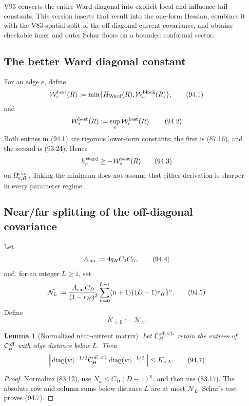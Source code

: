 \documentclass[11pt]{article}
\newtheorem{lemma}[theorem]{Lemma}
\theoremstyle{remark}
\begin{document}
V93 converts the entire Ward diagonal into explicit local and
influence-tail constants.  This version inserts that result into the
one-form Hessian, combines it with the V83 spatial split of the
off-diagonal current covariance, and obtains checkable inner and outer
Schur floors on a bounded conformal sector.

\subsection{The better Ward diagonal constant}

For an edge \(e\), define
\[
 \mathcal W_e^{\rm best}(R)
 :=\min\{H_{\rm Ward}(R),\mathcal W_e^{\rm block}(R)\},             \tag{94.1}
\]
and
\[
 \mathcal W_*^{\rm best}(R)
 :=\sup_e\mathcal W_e^{\rm best}(R).               \tag{94.2}
\]
Both entries in (94.1) are rigorous lower-form constants: the first is
(87.16), and the second is (93.24).  Hence
\[
 h_e^{\rm Ward}\geq-\mathcal W_e^{\rm best}(R)      \tag{94.3}
\]
on \(\Omega_{e,R}^{\rm star}\).  Taking the minimum does not assume
that either derivation is sharper in every parameter regime.

\subsection{Near/far splitting of the off-diagonal covariance}

Let
\[
 A_{\rm cur}:=4q_HC_0C_G,                           \tag{94.4}
\]
and, for an integer \(L\geq1\), set
\[
 \mathcal N_L
 :=\frac{A_{\rm cur}C_D}{(1-r_H)^2}
   \sum_{n=0}^{L-1}(n+1)\{(D-1)r_H\}^n.            \tag{94.5}
\]
Define
\[
 K_{<L}:=\mathcal N_L.                              \tag{94.6}
\]

\begin{lemma}[Normalized near-current matrix]
\label{lem:v17v94-near}
Let \(\mathsf C_H^{\rm off,<L}\) retain the entries of
\(\mathsf C_H^{\rm off}\) with edge distance below \(L\).  Then
\[
 \left\|
 \operatorname{diag}(w)^{-1/2}
 \mathsf C_H^{\rm off,<L}
 \operatorname{diag}(w)^{-1/2}
 \right\|\leq K_{<L}.                               \tag{94.7}
\]
\end{lemma}

\begin{proof}
Normalize (83.12), use \(N_n\leq C_D(D-1)^n\), and then use
(83.17).  The absolute row and column sums below distance \(L\) are
at most \(\mathcal N_L\).  Schur's test proves (94.7).
\end{proof}
\end{document}
